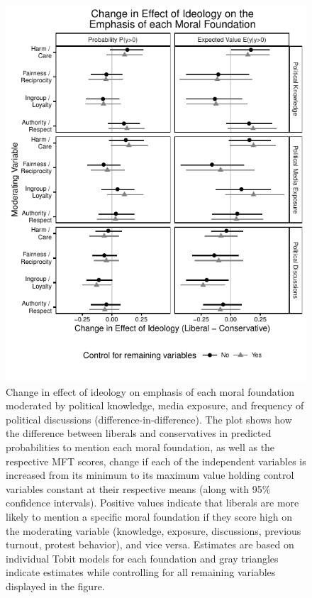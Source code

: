 \documentclass[12pt]{article}
\begin{document}
\begin{figure}[ht]\centering
\includegraphics[scale=.8]{../calc/fig/tobit_ideol_difdif.pdf}
\caption{Change in effect of ideology on emphasis of each moral foundation moderated by political knowledge, media exposure, and frequency of political discussions (difference-in-difference). The plot shows how the difference between liberals and conservatives in predicted probabilities to mention each moral foundation, as well as the respective MFT scores, change if each of the independent variables is increased from its minimum to its maximum value holding control variables constant at their respective means (along with 95\% confidence intervals). Positive values indicate that liberals are more likely to mention a specific moral foundation if they score high on the moderating variable (knowledge, exposure, discussions, previous turnout, protest behavior), and vice versa. Estimates are based on individual Tobit models for each foundation and gray triangles indicate estimates while controlling for all remaining variables displayed in the figure. %
}\label{fig:tobit_ideol_difdif}
\end{figure}
\end{document}

